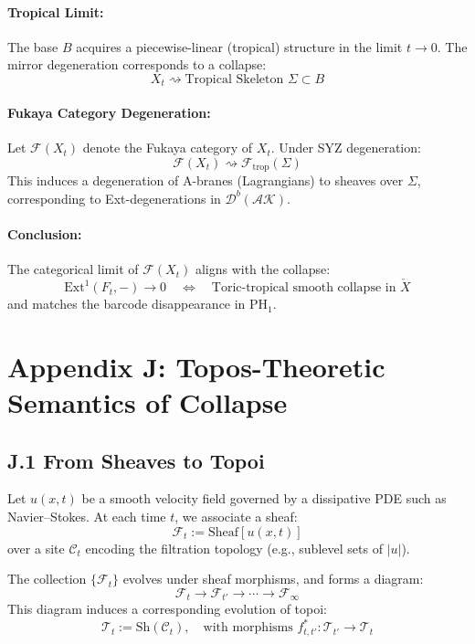 \documentclass[11pt]{article}
\begin{document}
\paragraph{Tropical Limit:}
The base $B$ acquires a piecewise-linear (tropical) structure in the limit $t \to 0$.
The mirror degeneration corresponds to a collapse:
\[
X_t \rightsquigarrow \text{Tropical Skeleton } \Sigma \subset B
\]

\paragraph{Fukaya Category Degeneration:}
Let $\mathcal{F}(X_t)$ denote the Fukaya category of $X_t$. Under SYZ degeneration:
\[
\mathcal{F}(X_t) \rightsquigarrow \mathcal{F}_{\mathrm{trop}}(\Sigma)
\]
This induces a degeneration of A-branes (Lagrangians) to sheaves over $\Sigma$, corresponding to Ext-degenerations in $\mathcal{D}^b(\mathcal{AK})$.

\paragraph{Conclusion:}
The categorical limit of $\mathcal{F}(X_t)$ aligns with the collapse:
\[
\mathrm{Ext}^1(F_t, -) \to 0 \quad \Longleftrightarrow \quad \text{Toric-tropical smooth collapse in } \check{X}
\]
and matches the barcode disappearance in $\mathrm{PH}_1$.




\section*{Appendix J: Topos-Theoretic Semantics of Collapse}

\subsection*{J.1 From Sheaves to Topoi}

Let $u(x,t)$ be a smooth velocity field governed by a dissipative PDE such as Navier–Stokes.  
At each time $t$, we associate a sheaf:
\[
\mathcal{F}_t := \mathrm{Sheaf}[u(x,t)]
\]
over a site $\mathcal{C}_t$ encoding the filtration topology (e.g., sublevel sets of $|u|$).

The collection $\{\mathcal{F}_t\}$ evolves under sheaf morphisms, and forms a diagram:
\[
\mathcal{F}_t \longrightarrow \mathcal{F}_{t'} \longrightarrow \cdots \longrightarrow \mathcal{F}_\infty
\]
This diagram induces a corresponding evolution of topoi:
\[
\mathscr{T}_t := \mathrm{Sh}(\mathcal{C}_t), \quad \text{with morphisms } f_{t,t'}^* : \mathscr{T}_{t'} \to \mathscr{T}_t
\]
\end{document}
